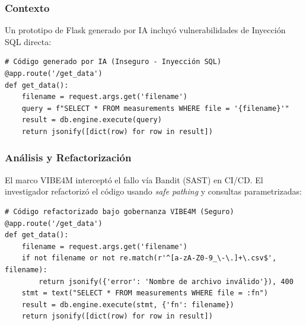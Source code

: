 \subsubsection*{Contexto}
Un prototipo de Flask generado por IA incluyó vulnerabilidades de Inyección SQL directa:

\begin{tcolorbox}[colback=bg_marfil, colframe=unmsm_gold, arc=3pt, boxrule=0.6pt, top=0.2cm, bottom=0.2cm, left=0.4cm, right=0.4cm]
\footnotesize
\begin{verbatim}
# Código generado por IA (Inseguro - Inyección SQL)
@app.route('/get_data')
def get_data():
    filename = request.args.get('filename')
    query = f"SELECT * FROM measurements WHERE file = '{filename}'"
    result = db.engine.execute(query)
    return jsonify([dict(row) for row in result])
\end{verbatim}
\end{tcolorbox}

\subsubsection*{Análisis y Refactorización}
El marco VIBE4M interceptó el fallo vía Bandit (SAST) en CI/CD. El investigador refactorizó el código usando \textit{safe pathing} y consultas parametrizadas:

\begin{tcolorbox}[colback=bg_marfil, colframe=unmsm_gold, arc=3pt, boxrule=0.6pt, top=0.2cm, bottom=0.2cm, left=0.4cm, right=0.4cm]
\footnotesize
\begin{verbatim}
# Código refactorizado bajo gobernanza VIBE4M (Seguro)
@app.route('/get_data')
def get_data():
    filename = request.args.get('filename')
    if not filename or not re.match(r'^[a-zA-Z0-9_\-\.]+\.csv$', filename):
        return jsonify({'error': 'Nombre de archivo inválido'}), 400
    stmt = text("SELECT * FROM measurements WHERE file = :fn")
    result = db.engine.execute(stmt, {'fn': filename})
    return jsonify([dict(row) for row in result])
\end{verbatim}
\end{tcolorbox}

